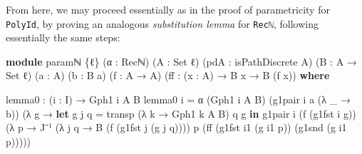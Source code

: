 \documentclass[
  12pt]{article}
\newenvironment{Shaded}{\begin{snugshade}}{\end{snugshade}}
\newcommand{\DataTypeTok}[1]{\textcolor[rgb]{0.00,0.34,0.68}{#1}}
\newcommand{\KeywordTok}[1]{\textcolor[rgb]{0.12,0.11,0.11}{\textbf{#1}}}
\newcommand{\NormalTok}[1]{\textcolor[rgb]{0.12,0.11,0.11}{#1}}
\newcommand{\OtherTok}[1]{\textcolor[rgb]{0.00,0.43,0.16}{#1}}
\begin{document}
From here, we may proceed essentially as in the proof of parametricity
for \texttt{PolyId}, by proving an analogous \emph{substitution lemma}
for \texttt{Recℕ}, following essentially the same steps:

\begin{Shaded}
\begin{Highlighting}[]
\KeywordTok{module}\NormalTok{ paramℕ }\OtherTok{\{}\NormalTok{ℓ}\OtherTok{\}} \OtherTok{(}\NormalTok{α }\OtherTok{:}\NormalTok{ Recℕ}\OtherTok{)} \OtherTok{(}\NormalTok{A }\OtherTok{:} \DataTypeTok{Set}\NormalTok{ ℓ}\OtherTok{)} \OtherTok{(}\NormalTok{pdA }\OtherTok{:}\NormalTok{ isPathDiscrete A}\OtherTok{)} 
                  \OtherTok{(}\NormalTok{B }\OtherTok{:}\NormalTok{ A }\OtherTok{→} \DataTypeTok{Set}\NormalTok{ ℓ}\OtherTok{)} \OtherTok{(}\NormalTok{a }\OtherTok{:}\NormalTok{ A}\OtherTok{)} \OtherTok{(}\NormalTok{b }\OtherTok{:}\NormalTok{ B a}\OtherTok{)}
                  \OtherTok{(}\NormalTok{f }\OtherTok{:}\NormalTok{ A }\OtherTok{→}\NormalTok{ A}\OtherTok{)} \OtherTok{(}\NormalTok{ff }\OtherTok{:} \OtherTok{(}\NormalTok{x }\OtherTok{:}\NormalTok{ A}\OtherTok{)} \OtherTok{→}\NormalTok{ B x }\OtherTok{→}\NormalTok{ B }\OtherTok{(}\NormalTok{f x}\OtherTok{))} \KeywordTok{where}

\NormalTok{    lemma0 }\OtherTok{:} \OtherTok{(}\NormalTok{i }\OtherTok{:}\NormalTok{ I}\OtherTok{)} \OtherTok{→}\NormalTok{ Gph1 i A B}
\NormalTok{    lemma0 i }\OtherTok{=}\NormalTok{ α }\OtherTok{(}\NormalTok{Gph1 i A B}\OtherTok{)}
                 \OtherTok{(}\NormalTok{g1pair i a }\OtherTok{(λ} \OtherTok{\_} \OtherTok{→}\NormalTok{ b}\OtherTok{))}
                 \OtherTok{(λ}\NormalTok{ g }\OtherTok{→} \KeywordTok{let}\NormalTok{ g\textquotesingle{} j q }\OtherTok{=}\NormalTok{ transp }\OtherTok{(λ}\NormalTok{ k }\OtherTok{→}\NormalTok{ Gph1 k A B}\OtherTok{)}\NormalTok{ q g }\KeywordTok{in}
\NormalTok{                        g1pair i }\OtherTok{(}\NormalTok{f }\OtherTok{(}\NormalTok{g1fst i g}\OtherTok{))}
                               \OtherTok{(λ}\NormalTok{ p }\OtherTok{→}\NormalTok{ J⁻¹ }\OtherTok{(λ}\NormalTok{ j q }\OtherTok{→}\NormalTok{ B }\OtherTok{(}\NormalTok{f }\OtherTok{(}\NormalTok{g1fst j }\OtherTok{(}\NormalTok{g\textquotesingle{} j q}\OtherTok{))))}\NormalTok{ p}
                                          \OtherTok{(}\NormalTok{ff }\OtherTok{(}\NormalTok{g1fst i1 }\OtherTok{(}\NormalTok{g\textquotesingle{} i1 p}\OtherTok{))} 
                                              \OtherTok{(}\NormalTok{g1snd }\OtherTok{(}\NormalTok{g\textquotesingle{} i1 p}\OtherTok{)))))}


\end{Highlighting}
\end{Shaded}
\end{document}
